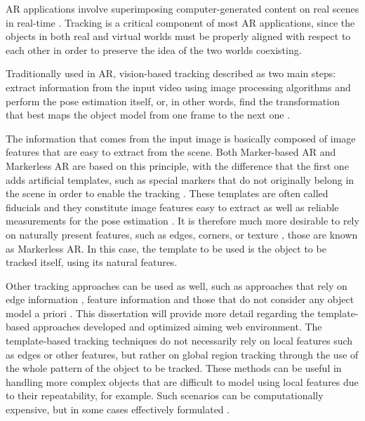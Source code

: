 AR applications involve superimposing computer-generated content on real scenes in real-time \cite{Azuma1997}. Tracking is a critical component of most AR applications, since the objects in both real and virtual worlds must be properly aligned with respect to each other in order to preserve the idea of the two worlds coexisting.

Traditionally used in AR, vision-based tracking described as two main steps: extract information from the input video using image processing algorithms and perform the pose estimation itself, or, in other words, find the transformation that best maps the object model from one frame to the next one \cite{Joma2013}.

The information that comes from the input image is basically composed of image features that are easy to extract from the scene. Both Marker-based AR and Markerless AR \cite{Lima2009a} are based on this principle, with the difference that the first one adds artificial templates, such as special markers that do not originally belong in the scene in order to enable the tracking \cite{Joma2013}. These templates are often called fiducials and they constitute image features easy to extract as well as reliable measurements for the pose estimation \cite{Cho1998,Lepetit2005}. It is therefore much more desirable to rely on naturally present features, such as edges, corners, or texture \cite{Lepetit2005}, those are known as Markerless AR. In this case, the template to be used is the object to be tracked itself, using its natural features.

Other tracking approaches can be used as well, such as approaches that rely on edge information \cite{Lima2009a}, feature information \cite{Wendt2008} and those that do not consider any object model a priori \cite{Lepetit2005,Joma2013}. This dissertation will provide more detail regarding the template-based approaches developed and optimized aiming web environment.
The template-based tracking techniques do not necessarily rely on local features such as edges or other features, but rather on global region tracking through the use of the whole pattern of the object to be tracked. These methods can be useful in handling more complex objects that are difficult to model using local features due to their repeatability, for example. Such scenarios can be computationally expensive, but in some cases effectively formulated \cite{Yilmaz2006}.


